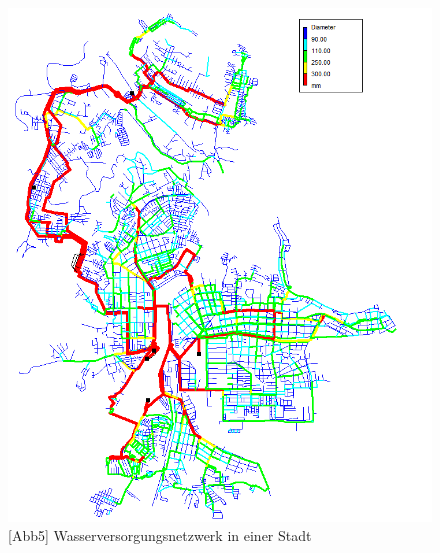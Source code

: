 \begin{frame}
			{
					\begin{figure}
						\includegraphics[scale=0.42]{pictures/Map-of-the-water-supply-network-diameter-of-pipes}
						\caption{[Abb5] Wasserversorgungsnetzwerk in einer Stadt}
					\end{figure}
				}
	
	
	
	
	
	
	
    
\end{frame}